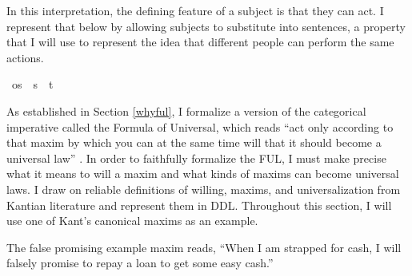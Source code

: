\begin{isabellebody}
\begin{isamarkuptext}
In this interpretation, the defining feature of a subject is that they can act. 
I represent that below by allowing subjects to substitute into sentences, a property that I will use 
to represent the idea that different people can perform the same actions.%
\end{isamarkuptext}\isamarkuptrue%
\isamarkupfalse%
\ os\ {\isacharequal}\ {\isachardoublequoteopen}{\isacharparenleft}s\ {\isasymRightarrow}\ t{\isacharparenright}{\isachardoublequoteclose}\ \isanewline
%
%
\isadelimdocument
%
\endisadelimdocument
%
\isatagdocument
%
\isamarkuptrue%
%
\endisatagdocument
{\isafolddocument}%
%
\isadelimdocument
%
\endisadelimdocument
%
\begin{isamarkuptext}%
As established in Section \ref{whyful}, I formalize a version of the categorical imperative called
the Formula of Universal, which reads ``act only according to that maxim by which you can at the same 
time will that it should become a universal law'' \citep[34]{groundwork}. In order to faithfully formalize
the FUL, I must make precise what it means to will a maxim and what kinds of maxims can become universal laws. 
I draw on reliable definitions of willing, maxims, and universalization from Kantian literature and represent them in DDL.
Throughout this section, I will use one of Kant's canonical maxims as an example.

\begin{example}\label{falsepromise}
  The false promising example maxim reads, ``When I am strapped for cash, I will falsely promise to repay a loan 
to get some easy cash.''
\end{example}


\end{isamarkuptext}
\end{isabellebody}
